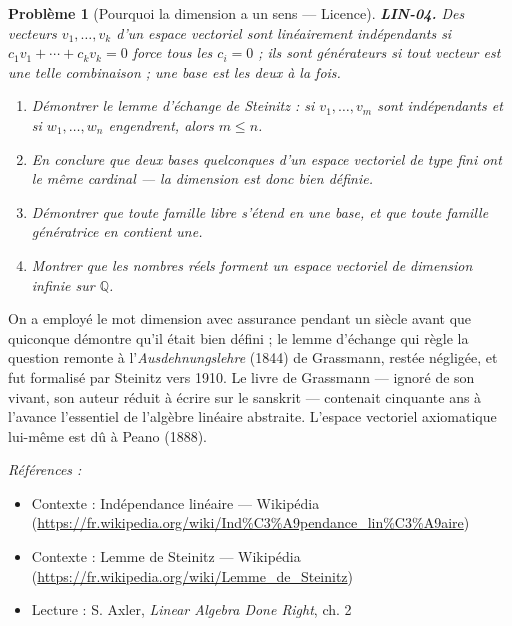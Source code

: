 \documentclass[11pt]{article}
\newtheorem{problem}{Problème}
\newenvironment{refs}{\par\small\noindent\emph{Références :}\begin{itemize}\setlength\itemsep{0pt}}{\end{itemize}\normalsize}
\begin{document}
\begin{problem}[{Pourquoi la dimension a un sens --- Licence}]
\textbf{LIN-04.} Des vecteurs $v_1, \dots, v_k$ d'un espace vectoriel sont
\textit{linéairement indépendants} si $c_1 v_1 + \cdots + c_k v_k = 0$ force tous les $c_i = 0$ ;
ils sont \textit{générateurs} si tout vecteur est une telle combinaison ; une \textit{base} est les
deux à la fois.
\begin{enumerate}
\item[(i)] Démontrer le
lemme d'échange de Steinitz : si $v_1, \dots, v_m$ sont indépendants et si $w_1, \dots, w_n$
engendrent, alors $m \le n$.
\item[(ii)] En conclure que deux bases quelconques d'un espace vectoriel
de type fini ont le même cardinal --- la \textit{dimension} est donc bien définie.
\item[(iii)] Démontrer que toute famille libre
s'étend en une base, et que toute famille génératrice en contient une.
\item[(iv)] Montrer que les nombres réels forment
un espace vectoriel de dimension infinie sur $\mathbb{Q}$.
\end{enumerate}

\end{problem}

\noindent On a employé le mot \og{} dimension \fg{} avec assurance pendant un siècle avant que
quiconque démontre qu'il était bien défini ; le lemme d'échange qui règle la question remonte à
l'\textit{Ausdehnungslehre} (1844) de Grassmann, restée négligée, et fut formalisé par Steinitz vers
1910. Le livre de Grassmann --- ignoré de son vivant, son auteur réduit à écrire sur le sanskrit ---
contenait cinquante ans à l'avance l'essentiel de l'algèbre linéaire abstraite. L'espace vectoriel
axiomatique lui-même est dû à Peano (1888).

\begin{refs}
\item Contexte : Indépendance linéaire --- Wikipédia (\url{https://fr.wikipedia.org/wiki/Ind%C3%A9pendance_lin%C3%A9aire})
\item Contexte : Lemme de Steinitz --- Wikipédia (\url{https://fr.wikipedia.org/wiki/Lemme_de_Steinitz})
\item Lecture : S. Axler, \textit{Linear Algebra Done Right}, ch. 2
\end{refs}

\bigskip
\end{document}

